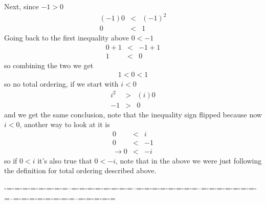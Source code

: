 \documentclass[aps,preprint,preprintnumbers,nofootinbib,showpacs,prd]{revtex4-1}
\newcommand{\nbea}{\begin{eqnarray*}}
\newcommand{\neea}{\end{eqnarray*}}
\begin{document}
Next, since $-1 > 0$
%
\nbea
(-1)0 & < & (-1)^2 \\
0 & < & 1
\neea
%
Going back to the first inequality above $0 < -1$
%
\nbea
0 + 1 & < & -1 + 1 \\
1 & < & 0
\neea
%
so combining the two we get
%
\nbea
1 < 0 < 1
\neea
%
so no total ordering, if we start with $i < 0$
%
\nbea
i^2 & > & (i)0 \\
-1 & > & 0
\neea
%
and we get the same conclusion, note that the inequality sign flipped because now $i < 0$, another way to look at it is
%
\nbea
0 & < & i \\
0 & < & -1 \\
\to 0 & < & -i
\neea
%
so if $0 < i$ it's also true that $0 < -i$, note that in the above we were just following the definition for total ordering described above.

-=-=-=-=-=-=-=-=--=-=-=-=-=-=-=-=--=-=-=-=-=-=-=-=--=-=-=-=-=-=-=-=--=-=-=-=-=-=-=-=--=-=-=-=-=
\end{document}
